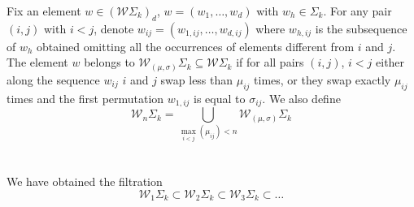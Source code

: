 	\begin{definition}
	Fix an element  $w\in (\mathcal{W}\Sigma_k)_{d}$, $w=(w_{1},\dots , w_{d})$ with $w_{h}\in \Sigma_k$. For any pair $(i,j)$ with $i< j$, denote $w_{ij}=(w_{1,ij},\dots , w_{d,ij})$ where $w_{h,ij}$ is the subsequence of $w_{h}$ obtained omitting all the occurrences of elements different from $i$ and $j$.
	The element $w$ belongs to $\mathcal{W}_{(\mu,\sigma)}\Sigma_k\subseteq \mathcal{W}\Sigma_k$ if for all pairs $(i,j)$, $i< j$ either along the sequence $w_{ij}$ $i$ and $j$ swap less than $\mu_{ij}$ times,
	 or they swap exactly $\mu_{ij}$ times and the first permutation $w_{1,ij}$ is equal to $\sigma_{ij}$. We also define
	  \begin{equation*}
	 	\label{def}
	 	\mathcal{W}_{n}\Sigma_k=\bigcup_{\max_{i<j} (\mu_{ij})< n} \mathcal{W}_{(\mu,\sigma)}\Sigma_{k}
	 \end{equation*}
	\\
	\\
	We have obtained the filtration $$\mathcal{W}_1\Sigma_k \subset \mathcal{W}_2 \Sigma_k
	\subset \mathcal{W}_3 \Sigma_k
	\subset \dots $$

\end{definition}

